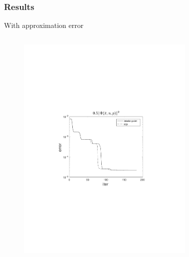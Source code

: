 \documentclass{beamer}
\begin{document}
\begin{frame}
    \frametitle{Results}
    With approximation error

    \begin{columns}[t]
            \begin{figure}
                \centering
                \includegraphics[trim=4cm 9cm 4cm 8.5cm, clip=true, width=\linewidth]{img/convPlotPhi_1}
            \end{figure}
            \begin{figure}
                \centering

\end{figure}
\end{columns}
\end{frame}
\end{document}
